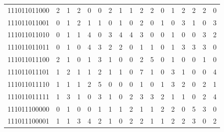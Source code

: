\documentclass[10pt,a4paper]{article}
\begin{document}
\begin{longtable}{ |c|c|c|c|c|c|c|c|c|c|c|c|c|c|c|c|c| }
    111011011000              & 2                            & 1                                & 2                            & 0                              & 0   & 2   & 1   & 1   & 2   & 2   & 0   & 1   & 2   & 2   & 2   & 0   \\
    111011011001              & 0                            & 1                                & 2                            & 1                              & 1   & 0   & 1   & 0   & 2   & 0   & 1   & 0   & 3   & 1   & 0   & 3   \\
    111011011010              & 0                            & 1                                & 1                            & 4                              & 0   & 3   & 4   & 4   & 3   & 0   & 0   & 1   & 0   & 0   & 3   & 2   \\
    111011011011              & 0                            & 1                                & 0                            & 4                              & 3   & 2   & 2   & 0   & 1   & 1   & 0   & 1   & 3   & 3   & 3   & 0   \\
    111011011100              & 2                            & 1                                & 0                            & 1                              & 3   & 1   & 0   & 0   & 2   & 5   & 0   & 1   & 0   & 0   & 1   & 0   \\
    111011011101              & 1                            & 2                                & 1                            & 1                              & 2   & 1   & 1   & 0   & 7   & 1   & 0   & 3   & 1   & 0   & 0   & 4   \\
    111011011110              & 1                            & 1                                & 1                            & 2                              & 5   & 0   & 0   & 0   & 1   & 0   & 1   & 3   & 2   & 0   & 2   & 1   \\
    111011011111              & 1                            & 3                                & 1                            & 0                              & 3   & 1   & 0   & 2   & 3   & 3   & 2   & 1   & 1   & 0   & 2   & 4   \\
    111011100000              & 0                            & 1                                & 0                            & 0                              & 1   & 1   & 1   & 2   & 1   & 1   & 2   & 2   & 0   & 5   & 3   & 0   \\
    111011100001              & 1                            & 1                                & 3                            & 4                              & 2   & 1   & 0   & 2   & 2   & 1   & 1   & 2   & 2   & 3   & 0   & 2   \\

\end{longtable}
\end{document}
